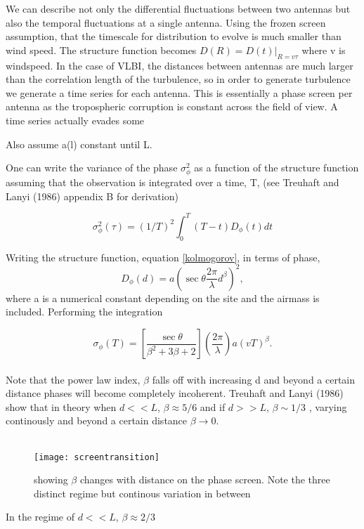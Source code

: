 We can describe not only the differential fluctuations between two antennas but also the temporal fluctuations at a single antenna. Using the frozen screen assumption, that the timescale for distribution to evolve is much smaller than wind speed. The structure function becomes  $D(R)=D(t)|_{R=v \tau}$ where v is windspeed. In the case of VLBI, the distances between antennas are much larger than the correlation length of the turbulence, so in order to generate turbulence we generate a time series for each antenna. This is essentially a phase screen per antenna as the tropospheric corruption is constant across the field of view. A time series actually evades some  

Also assume a(l) constant until L.

One can write the variance of the phase $\sigma_\phi^2$ as a function of the structure function assuming that the observation is integrated over a time, T, (see Treuhaft and Lanyi (1986) appendix B for derivation)

\begin{equation}
\sigma^2_{\phi}(\tau) = (1/T)^2 \int_{0}^{T} (T-t) D_{\phi}(t) dt
\end{equation}

Writing the structure function, equation \ref{kolmogorov}, in terms of phase,
\begin{equation}
D_{\phi}(d)=a\left( \sec\theta \frac{2 \pi}{\lambda} d^{\beta} \right)^2  ,
\end{equation}
where a is a numerical constant depending on the site and the airmass is included. Performing the integration

\begin{equation}
\sigma_\phi (T)=\left[\frac{\sec\theta}{\beta^2 +3\beta +2}\right]( \frac{2 \pi}{\lambda}) a (v T)^{\beta}.
\end{equation}\\

Note that the power law index, $\beta$ falls off with increasing d and beyond a certain distance phases will become completely incoherent. Treuhaft and Lanyi (1986) show that in theory when $d<<L$, $\beta \approx 5/6$ and if $d>>L$,  $\beta \sim 1/3$ , varying continously and beyond a certain distance $\beta \to 0$.  \\
\\

\begin{figure}[h!]
\centering
    \texttt{[image: screentransition]}
    \caption{showing $\beta$ changes with distance on the phase screen. Note the three distinct regime but continous variation in between}
\end{figure}
In the regime of $d<<L$, $\beta \approx 2/3$

